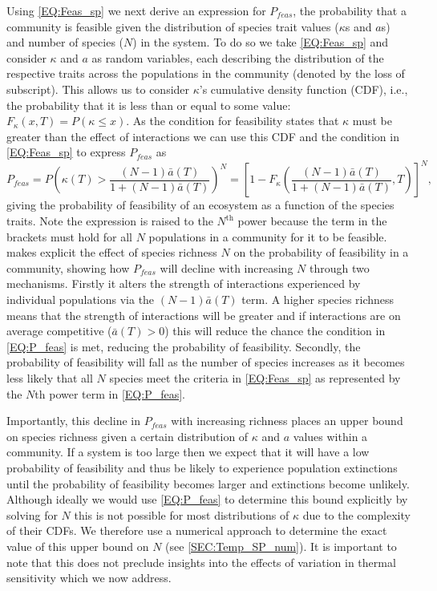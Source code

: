 \documentclass{article}
\begin{document}
Using \cref{EQ:Feas_sp} we next derive an expression for $P_{feas}$, the probability that a community is feasible given the distribution of species trait values ($\kappa$s and $a$s) and number of species ($N$) in the system. To do so we take \cref{EQ:Feas_sp} and consider $\kappa$ and $a$ as random variables, each describing the distribution of the respective traits across the populations in the community (denoted by the loss of subscript). This allows us to consider $\kappa$'s cumulative density function (CDF), i.e., the probability that it is less than or equal to some value: $F_{\kappa}(x,T) = P(\kappa \leq x)$. As the condition for feasibility states that $\kappa$ must be greater than the effect of interactions we can use this CDF and the condition in \cref{EQ:Feas_sp} to express $P_{feas}$ as
\begin{equation} \label{EQ:P_feas}
    P_{feas} = P \left( \kappa(T) > \frac{(N-1)\bar{a}(T)}{1 + (N-1)\bar{a}(T)}  \right)^N = 
    \left[1 - F_{\kappa}\left(\frac{(N-1)\bar{a}(T)}{1 + (N-1)\bar{a}(T)},T \right)\right]^N,
\end{equation}
giving the probability of feasibility of an ecosystem as a function of the species traits. Note the expression is raised to the $N^\text{th}$ power because the term in the brackets must hold for all $N$ populations in a community for it to be feasible.  makes explicit the effect of species richness $N$ on the probability of feasibility in a community, showing how $P_{feas}$ will decline with increasing $N$ through two mechanisms. Firstly it alters the strength of interactions experienced by individual populations via the $(N-1) \bar{a}(T)$ term. A higher species richness means that the strength of interactions will be greater and if interactions are on average competitive ($\bar{a}(T) > 0$) this will reduce the chance the condition in \cref{EQ:P_feas} is met, reducing the probability of feasibility. Secondly, the probability of feasibility will fall as the number of species increases as it becomes less likely that all $N$ species meet the criteria in \cref{EQ:Feas_sp} as represented by the $N\text{th}$ power term in \cref{EQ:P_feas}. 

Importantly, this decline in $P_{feas}$ with increasing richness places an upper bound on species richness given a certain distribution of $\kappa$ and $a$ values within a community. If a system is too large then we expect that it will have a low probability of feasibility and thus be likely to experience population extinctions until the probability of feasibility becomes larger and extinctions become unlikely. Although ideally we would use \cref{EQ:P_feas} to determine this bound explicitly by solving for $N$ this is not possible for most distributions of $\kappa$ due to the complexity of their CDFs. We therefore use a numerical approach to determine the exact value of this upper bound on $N$ (see \cref{SEC:Temp_SP_num}). It is important to note that this does not preclude insights into the effects of variation in thermal sensitivity which we now address. 
\end{document}
